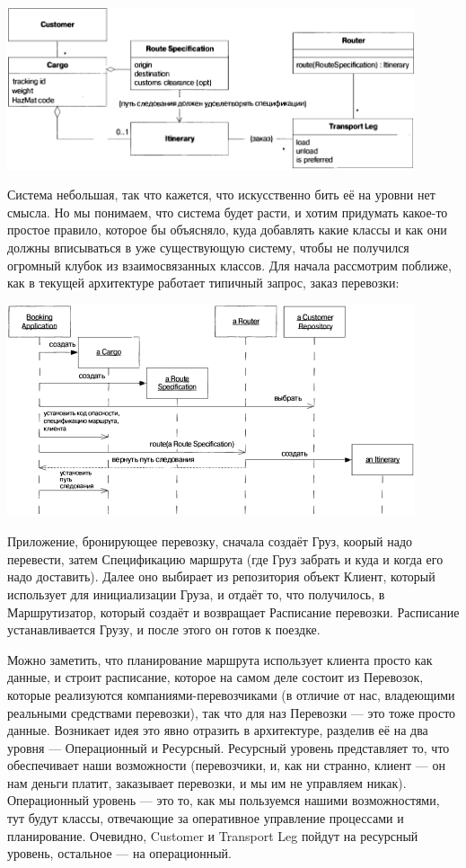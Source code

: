 \documentclass{../../text-style}
\begin{document}
\begin{center}
    \includegraphics[width=0.9\textwidth]{cargoNonLayered.png}
\end{center}

Система небольшая, так что кажется, что искусственно бить её на уровни нет смысла. Но мы понимаем, что система будет расти, и хотим придумать какое-то простое правило, которое бы объясняло, куда добавлять какие классы и как они должны вписываться в уже существующую систему, чтобы не получился огромный клубок из взаимосвязанных классов. Для начала рассмотрим поближе, как в текущей архитектуре работает типичный запрос, заказ перевозки:

\begin{center}
    \includegraphics[width=0.9\textwidth]{cargoNonLayeredSequence.png}
\end{center}

Приложение, бронирующее перевозку, сначала создаёт Груз, коорый надо перевести, затем Спецификацию маршрута (где Груз забрать и куда и когда его надо доставить). Далее оно выбирает из репозитория объект Клиент, который использует для инициализации Груза, и отдаёт то, что получилось, в Маршрутизатор, который создаёт и возвращает Расписание перевозки. Расписание устанавливается Грузу, и после этого он готов к поездке.

Можно заметить, что планирование маршрута использует клиента просто как данные, и строит расписание, которое на самом деле состоит из Перевозок, которые реализуются компаниями-перевозчиками (в отличие от нас, владеющими реальными средствами перевозки), так что для наз Перевозки --- это тоже просто данные. Возникает идея это явно отразить в архитектуре, разделив её на два уровня --- Операционный и Ресурсный. Ресурсный уровень представляет то, что обеспечивает наши возможности (перевозчики, и, как ни странно, клиент --- он нам деньги платит, заказывает перевозки, и мы им не управляем никак). Операционный уровень --- это то, как мы пользуемся нашими возможностями, тут будут классы, отвечающие за оперативное управление процессами и планирование. Очевидно, Customer и Transport Leg пойдут на ресурсный уровень, остальное --- на операционный.
\end{document}
